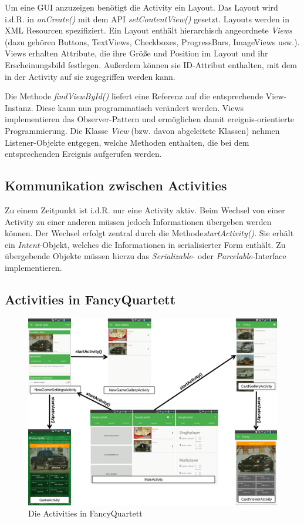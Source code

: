 Um eine GUI anzuzeigen benötigt die Activity ein Layout. Das Layout wird i.d.R. in \emph{onCreate()} mit dem API \emph{setContentView()} gesetzt. Layouts werden in XML Resourcen spezifiziert. Ein Layout enthält hierarchisch angeordnete \emph{Views} (dazu gehören Buttons, TextViews, Checkboxes, ProgressBars, ImageViews usw.). Views erhalten Attribute, die ihre Größe und Position im Layout und ihr Erscheinungsbild festlegen. Außerdem können sie ID-Attribut enthalten, mit dem in der Activity auf sie zugegriffen werden kann.

Die Methode \emph{findViewById()} liefert eine Referenz auf die entsprechende View-Instanz. Diese kann nun programmatisch verändert werden. Views implementieren das Observer-Pattern und ermöglichen damit ereignis-orientierte Programmierung. Die Klasse \emph{View} (bzw. davon abgeleitete Klassen) nehmen  Listener-Objekte entgegen, welche Methoden enthalten, die bei dem entsprechenden Ereignis aufgerufen werden.

\subsection{Kommunikation zwischen Activities}

Zu einem Zeitpunkt ist i.d.R. nur eine Activity aktiv. Beim Wechsel von einer Activity zu einer anderen müssen jedoch Informationen übergeben werden können. Der Wechsel erfolgt zentral durch die Methode\emph{startActivity()}. Sie erhält ein \emph{Intent}-Objekt, welches die Informationen in serialisierter Form enthält. Zu übergebende Objekte müssen hierzu das \emph{Serializable}- oder \emph{Parcelable}-Interface implementieren.

\subsection{Activities in FancyQuartett}
\label{sec:activities_in_fancyquartett}
\begin{figure}[ht]
    \centering
    \includegraphics[width=\textwidth]{../img/Activities.pdf}
    \caption{Die Activities in FancyQuartett}
    \label{fig:activities_in_fancyquartett}
\end{figure}

